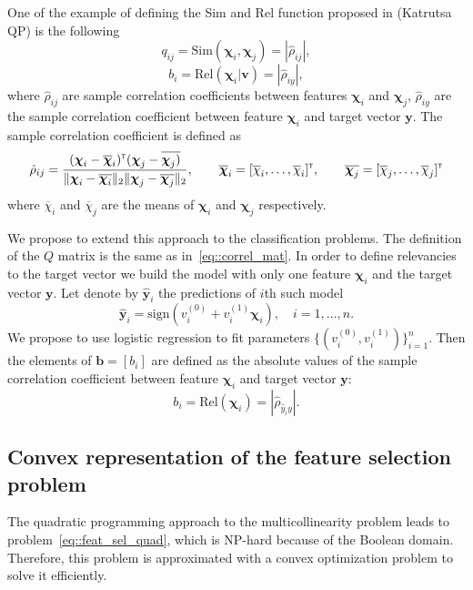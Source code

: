 \documentclass[a4paper,12pt]{article}
\theoremstyle{plain} %
\theoremstyle{definition} %
\theoremstyle{remark} %
\newcommand{\by}{\mathbf{y}}
\newcommand{\bchi}{\boldsymbol{\chi}}
\newcommand{\T}{{\text{\tiny\sffamily\upshape\mdseries T}}}
\begin{document}
	One of the example of defining the Sim and Rel function proposed in (Katrutsa QP) is the following
	\begin{equation}
	q_{ij} = \text{Sim}(\boldsymbol{\chi}_i, \boldsymbol{\chi}_j) = |\hat{\rho}_{ij}|,
	\label{eq::correl_mat}
	\end{equation}
	\begin{equation}
	b_i = \text{Rel}\left(\boldsymbol{\chi}_i | \mathbf{v}\right) = |\hat{\rho}_{iy}|,
	\label{eq::correl_vec_reg}
	\end{equation}
	where $\hat{\rho}_{ij}$ are sample correlation coefficients between features $\bchi_i$ and $\bchi_j$, $\hat{\rho}_{iy}$ are the sample correlation coefficient between feature $\bchi_i$ and target vector $\by$.
	 The sample correlation coefficient is defined as 
	 \begin{equation}
	 \hat{\rho}_{ij} = \dfrac{(\bchi_i - \overline{\bchi}_i)^{\T}(\bchi_j - \overline{\bchi_j)}}{ \|\bchi_i - \overline{\bchi_i}\|_2 \| \bchi_{j} - \overline{\bchi_j}\|_2}, \qquad \overline{\bchi}_i = [\overline{\chi}_i, \ldots, \overline{\chi}_i]^{\T}, \qquad \overline{\bchi_j} = [\overline{\chi}_j, \ldots, \overline{\chi}_j]^{\T}
	 					\label{eq::coef_corell}
	 \end{equation}
	 where $\overline{\chi}_i$ and $\overline{\chi}_j$ are the means of $\bchi_i$ and $\bchi_j$ respectively.
	 
	 We propose to extend this approach to the classification problems. The definition of the $Q$ matrix is the same as in~\eqref{eq::correl_mat}. In order to define relevancies to the target vector we build the model with only one feature $\bchi_i$ and the target vector $\by$. Let denote by $\mathbf{\hat{y}}_i$ the predictions of $i$th such model
	 \[
	 		\mathbf{\hat{y}}_i= \text{sign} \left( v^{(0)}_i + v^{(1)}_i \boldsymbol{\chi}_i \right), \quad i=1, \dots, n.
	 \]
	 We propose to use logistic regression to fit parameters $\{(v^{(0)}_i, v^{(1)}_i )\}_{i=1}^n$. 
	 Then the elements of $\mathbf{b} = [b_i]$ are defined as the absolute values of the sample correlation coefficient between {\color{blue}{the}} feature $\boldsymbol{\chi}_i$ and {\color{blue}{the}} target vector $\mathbf{y}$:
	 \begin{equation}
	 b_i = \text{Rel}\left(\bchi_i\right) = |\hat{\rho}_{\hat{y}_iy}|.
	 \label{eq::correl_vec}
	 \end{equation}
	 
	 \subsection{Convex representation of the feature selection problem}
	 The quadratic programming approach to the multicollinearity problem leads to problem~\eqref{eq::feat_sel_quad}, which is NP-hard because of the Boolean domain.
	 Therefore, this problem is approximated with a convex optimization problem to solve it efficiently.
	 
\end{document}

